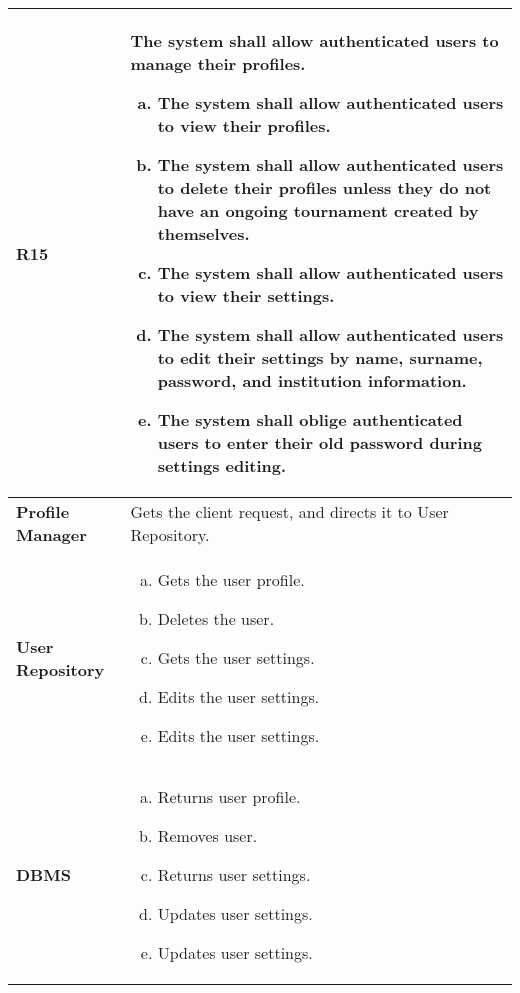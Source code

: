 \begin{table}[h!]
  \centering
  \begin{tabular}{lp{12cm}}
    \hline
    \textbf{R15} & The system shall allow authenticated users to manage their profiles.
  \begin{enumerate}[(a)]
      \item The system shall allow authenticated users to view their profiles.
      
  \item The system shall allow authenticated users to delete their profiles unless they do not have an ongoing tournament created by themselves.

    \item The system shall allow authenticated users to view their settings.
  \item The system shall allow authenticated users to edit their settings by name, surname, password, and institution information.
  \item The system shall oblige authenticated users to enter their old password during settings editing.
  
      
  \end{enumerate}
\\
    \hline
    \hline
    \textbf{Profile Manager} & Gets the client request, and directs it to User Repository. \\
    \textbf{User Repository} & \begin{enumerate}[(a)]
      \item Gets the user profile.
      
  \item Deletes the user.
    \item Gets the user settings.
  \item Edits the user settings.
  \item Edits the user settings.
  
      
  \end{enumerate}
    
    \\
    \textbf{DBMS} & \begin{enumerate}[(a)]
      \item Returns user profile.
      
  \item Removes user.

    \item Returns user settings.
  \item Updates user settings.
\item Updates user settings.
  
      
  \end{enumerate}
    
    
    
    \\
    \hline
  \end{tabular}
\end{table}



